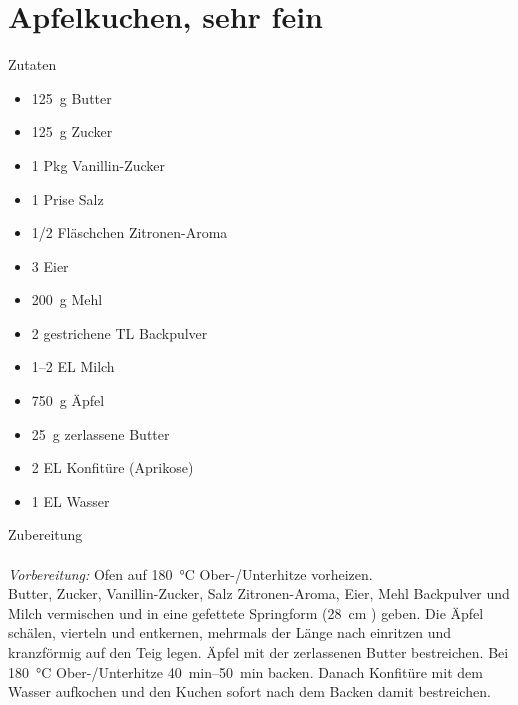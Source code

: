 \section*{Apfelkuchen, sehr fein}
\ihead{}\ohead{}
\cfoot{}
{\Large Zutaten}
\begin{multicols}{2}
\begin{itemize}
    \item \SI{125}{g} Butter
    \item \SI{125}{g} Zucker
    \item \num{1} Pkg Vanillin-Zucker
    \item \num{1} Prise Salz
    \item \num{1/2} Fläschchen Zitronen-Aroma
    \item \num{3} Eier
    \item \SI{200}{g} Mehl
    \item \num{2} gestrichene TL Backpulver
    \item \numrange{1}{2} EL Milch
    \item \SI{750}{g} Äpfel
    \item \SI{25}{g} zerlassene Butter
    \item \num{2} EL Konfitüre (Aprikose)
    \item \num{1} EL Wasser
\end{itemize}
\columnbreak
\end{multicols}
\noindent
{\Large Zubereitung}\\
\\
\textit{Vorbereitung:} Ofen auf \SI{180}{\celsius} Ober-/Unterhitze vorheizen.\\
Butter, Zucker, Vanillin-Zucker, Salz Zitronen-Aroma, Eier, Mehl Backpulver und Milch vermischen und in eine gefettete Springform (\SI{28}{cm} \diameter) geben.
Die Äpfel schälen, vierteln und entkernen, mehrmals der Länge nach einritzen und kranzförmig auf den Teig legen. 
Äpfel mit der zerlassenen Butter bestreichen.
Bei \SI{180}{\celsius} Ober-/Unterhitze \SIrange{40}{50}{min} backen. 
Danach Konfitüre mit dem Wasser aufkochen und den Kuchen sofort nach dem Backen damit bestreichen. 